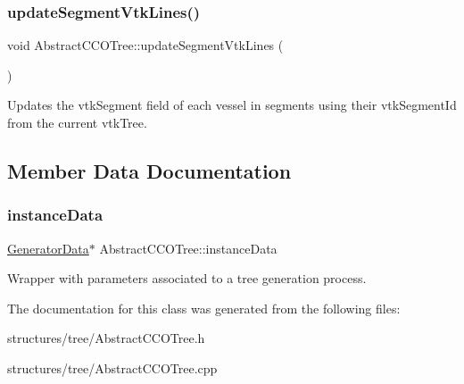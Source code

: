 \subsubsection{\texorpdfstring{update\+Segment\+Vtk\+Lines()}{updateSegmentVtkLines()}}
{\footnotesize\ttfamily void Abstract\+C\+C\+O\+Tree\+::update\+Segment\+Vtk\+Lines (\begin{DoxyParamCaption}{ }\end{DoxyParamCaption})\hspace{0.3cm}{\ttfamily [protected]}}

Updates the {\ttfamily vtk\+Segment} field of each vessel in segments using their {\ttfamily vtk\+Segment\+Id} from the current {\ttfamily vtk\+Tree}. 

\subsection{Member Data Documentation}
\mbox{\label{class_abstract_c_c_o_tree_afd240b7fad46ddf0a2ed78558cc9b9ca}} 
\subsubsection{\texorpdfstring{instance\+Data}{instanceData}}
{\footnotesize\ttfamily \mbox{\hyperlink{class_generator_data}{Generator\+Data}}$\ast$ Abstract\+C\+C\+O\+Tree\+::instance\+Data\hspace{0.3cm}{\ttfamily [protected]}}

Wrapper with parameters associated to a tree generation process. 

The documentation for this class was generated from the following files\+:\begin{DoxyCompactItemize}
\item 
structures/tree/Abstract\+C\+C\+O\+Tree.\+h\item 
structures/tree/Abstract\+C\+C\+O\+Tree.\+cpp\end{DoxyCompactItemize}

